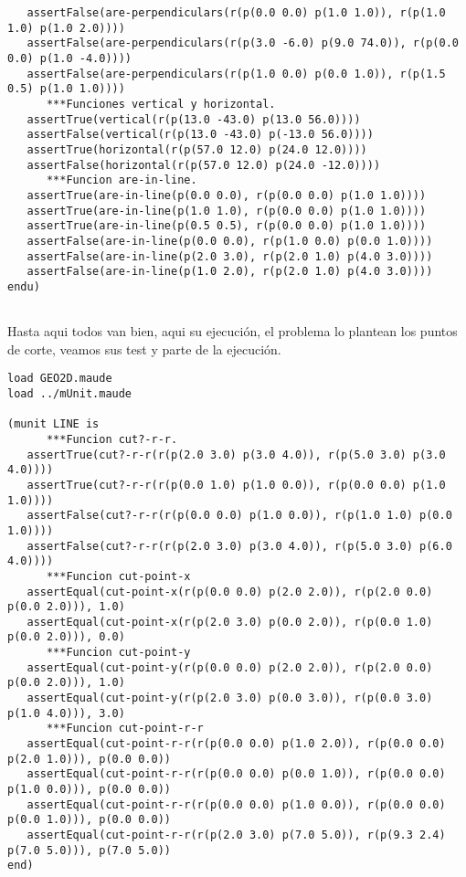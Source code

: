 \begin{verbatim}
   assertFalse(are-perpendiculars(r(p(0.0 0.0) p(1.0 1.0)), r(p(1.0 1.0) p(1.0 2.0))))
   assertFalse(are-perpendiculars(r(p(3.0 -6.0) p(9.0 74.0)), r(p(0.0 0.0) p(1.0 -4.0))))
   assertFalse(are-perpendiculars(r(p(1.0 0.0) p(0.0 1.0)), r(p(1.5 0.5) p(1.0 1.0))))
      ***Funciones vertical y horizontal.
   assertTrue(vertical(r(p(13.0 -43.0) p(13.0 56.0))))
   assertFalse(vertical(r(p(13.0 -43.0) p(-13.0 56.0))))
   assertTrue(horizontal(r(p(57.0 12.0) p(24.0 12.0))))
   assertFalse(horizontal(r(p(57.0 12.0) p(24.0 -12.0))))
      ***Funcion are-in-line.
   assertTrue(are-in-line(p(0.0 0.0), r(p(0.0 0.0) p(1.0 1.0))))
   assertTrue(are-in-line(p(1.0 1.0), r(p(0.0 0.0) p(1.0 1.0))))
   assertTrue(are-in-line(p(0.5 0.5), r(p(0.0 0.0) p(1.0 1.0))))
   assertFalse(are-in-line(p(0.0 0.0), r(p(1.0 0.0) p(0.0 1.0))))
   assertFalse(are-in-line(p(2.0 3.0), r(p(2.0 1.0) p(4.0 3.0))))
   assertFalse(are-in-line(p(1.0 2.0), r(p(2.0 1.0) p(4.0 3.0))))
endu)
	
\end{verbatim}

Hasta aqui todos van bien, aqui su ejecuci\'on, el problema lo plantean los puntos de corte, veamos sus test y parte de la ejecuci\'on.

\begin{verbatim}
load GEO2D.maude
load ../mUnit.maude

(munit LINE is
      ***Funcion cut?-r-r.
   assertTrue(cut?-r-r(r(p(2.0 3.0) p(3.0 4.0)), r(p(5.0 3.0) p(3.0 4.0))))
   assertTrue(cut?-r-r(r(p(0.0 1.0) p(1.0 0.0)), r(p(0.0 0.0) p(1.0 1.0))))
   assertFalse(cut?-r-r(r(p(0.0 0.0) p(1.0 0.0)), r(p(1.0 1.0) p(0.0 1.0))))
   assertFalse(cut?-r-r(r(p(2.0 3.0) p(3.0 4.0)), r(p(5.0 3.0) p(6.0 4.0))))
      ***Funcion cut-point-x
   assertEqual(cut-point-x(r(p(0.0 0.0) p(2.0 2.0)), r(p(2.0 0.0) p(0.0 2.0))), 1.0)
   assertEqual(cut-point-x(r(p(2.0 3.0) p(0.0 2.0)), r(p(0.0 1.0) p(0.0 2.0))), 0.0)
      ***Funcion cut-point-y
   assertEqual(cut-point-y(r(p(0.0 0.0) p(2.0 2.0)), r(p(2.0 0.0) p(0.0 2.0))), 1.0)
   assertEqual(cut-point-y(r(p(2.0 3.0) p(0.0 3.0)), r(p(0.0 3.0) p(1.0 4.0))), 3.0)
      ***Funcion cut-point-r-r
   assertEqual(cut-point-r-r(r(p(0.0 0.0) p(1.0 2.0)), r(p(0.0 0.0) p(2.0 1.0))), p(0.0 0.0))
   assertEqual(cut-point-r-r(r(p(0.0 0.0) p(0.0 1.0)), r(p(0.0 0.0) p(1.0 0.0))), p(0.0 0.0))
   assertEqual(cut-point-r-r(r(p(0.0 0.0) p(1.0 0.0)), r(p(0.0 0.0) p(0.0 1.0))), p(0.0 0.0))
   assertEqual(cut-point-r-r(r(p(2.0 3.0) p(7.0 5.0)), r(p(9.3 2.4) p(7.0 5.0))), p(7.0 5.0))
end)
\end{verbatim}

